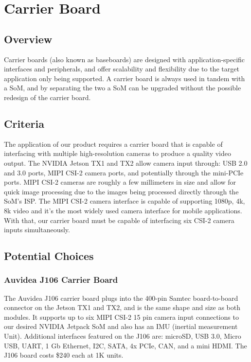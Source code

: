 \section{Carrier Board}

\subsection{Overview}

Carrier boards (also known as baseboards) are designed with application-specific 
interfaces and peripherals, and offer scalability and flexibility due to the target 
application only being supported. A carrier board is always used in tandem with a SoM, 
and by separating the two a SoM can be upgraded without the possible redesign of the 
carrier board\cite{ToradexSBC, ArrowCB, ToradexCBQ}.\\

\subsection{Criteria}

The application of our product requires a carrier board that is capable of interfacing 
with multiple high-resolution cameras to produce a quality video output. The NVIDIA Jetson TX1 
and TX2 allow camera input through: USB 2.0 and 3.0 ports, MIPI CSI-2 camera ports, and 
potentially through the mini-PCIe ports\cite{JetsonCams}. MIPI CSI-2 cameras are roughly a few millimeters 
in size and allow for quick image processing due to the images being processed directly 
through the SoM's ISP. The MIPI CSI-2 camera interface is capable of supporting 1080p, 
4k, 8k video and it's the most widely used camera interface for mobile 
applications\cite{MIPIOverview}. With that, our carrier board must be capable of interfacing  
six CSI-2 camera inputs simultaneously. \\

\subsection{Potential Choices}

\subsubsection{Auvidea J106 Carrier Board}

The Auvidea J106 carrier board plugs into the 400-pin Samtec board-to-board connector 
on the Jetson TX1 and TX2, and is the same shape and size as both modules. 
It supports up to six MIPI CSI-2 15 pin camera input connections to our 
desired NVIDIA Jetpack SoM and also has an IMU (inertial measurement Unit). Additional 
interfaces featured on the J106 are: microSD, USB 
3.0, Micro USB, UART, 1 Gb Ethernet, I2C, SATA, 4x PCIe, CAN, and a mini 
HDMI\cite{AuvideaJ106}. The J106 board costs \$240 each at 1K units\cite{AuvideaQuote}.\\

